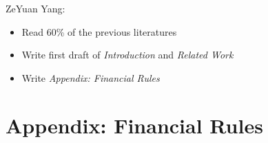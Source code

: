 \documentclass{article}
\begin{document}
\noindent
ZeYuan Yang:

\begin{itemize}
    \item Read 60\% of the previous literatures
    \item Write first draft of \textit{Introduction} and \textit{Related Work}
    \item Write \textit{Appendix: Financial Rules}
\end{itemize}





\section{Appendix: Financial Rules}\label{section-appendix-financial-rules}
\end{document}
